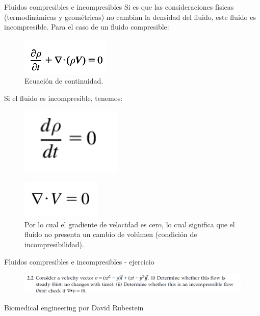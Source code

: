 \begin{frame}{Fluidos compresibles e incompresibles}
\justifying
Si es que las consideraciones físicas (termodinámicas y geométricas) no cambian la densidad del fluido, este fluido es incompresible.
Para el caso de un fluido compresible:
\begin{figure}[H]
\centering
\includegraphics[scale=0.4]{Section_Files/S2-imagenes-Manuel/14.png}
\caption{Ecuación de continuidad.}
\end{figure}
Si el fluido es incompresible, tenemos:
\begin{figure}[H]
\centering
\includegraphics[scale=0.2]{Section_Files/S2-imagenes-Manuel/15.png}
\end{figure}
\begin{figure}[H]
\centering
\includegraphics[scale=0.3]{Section_Files/S2-imagenes-Manuel/16.png}
\caption{Por lo cual el gradiente de velocidad es cero, lo cual significa que el fluido no presenta un cambio de volúmen (condición de incompresibilidad).}
\end{figure}
\end{frame}

\begin{frame}{Fluidos compresibles e incompresibles - ejercicio}
\begin{figure}[H]
\centering
\includegraphics[scale=0.4]{Section_Files/S2-imagenes-Manuel/17.png}
\end{figure}
{\tiny Biomedical engineering por David Rubestein}
\end{frame}